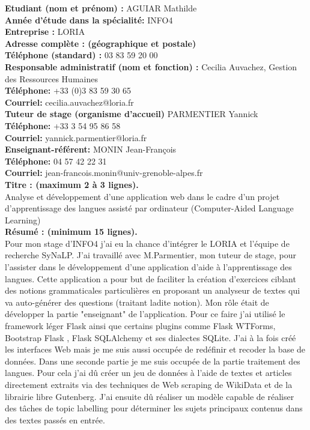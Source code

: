 

\textbf{Etudiant (nom et prénom) :} AGUIAR Mathilde \\
\textbf{Année d’étude dans la spécialité:} INFO4 \\

\textbf{Entreprise :} LORIA \\
\textbf{Adresse complète : (géographique et postale)} \\
\textbf{Téléphone (standard) :} 03 83 59 20 00 \\

\textbf{Responsable administratif (nom et fonction) :} Cecilia Auvachez, Gestion des Ressources Humaines \\
\textbf{Téléphone:} +33 (0)3 83 59 30 65 \\
\textbf{Courriel:} cecilia.auvachez@loria.fr \\

\textbf{Tuteur de stage (organisme d’accueil)} PARMENTIER Yannick\\
\textbf{Téléphone:} +33 3 54 95 86 58 \\
\textbf{Courriel:} yannick.parmentier@loria.fr \\

\textbf{Enseignant-référent:} MONIN Jean-François \\
\textbf{Téléphone:} 04 57 42 22 31 \\
\textbf{Courriel:} jean-francois.monin@univ-grenoble-alpes.fr \\

\textbf{Titre : (maximum 2 à 3 lignes).} \\
Analyse et développement d’une application web dans le cadre d’un projet
d’apprentissage des langues assisté par ordinateur (Computer-Aided Language
Learning) \\
\textbf{Résumé : (minimum 15 lignes).}\\
Pour mon stage d’INFO4 j’ai eu la chance d’intégrer le LORIA et l’équipe de recherche SyNaLP. J’ai travaillé avec M.Parmentier, mon tuteur de stage, pour l’assister dans le développement d’une application d’aide à l’apprentissage des langues. Cette application a pour but de faciliter la création d’exercices ciblant des notions grammaticales particulières en proposant un analyseur de textes qui va auto-générer des questions (traitant ladite notion). 
Mon rôle était de développer la partie "enseignant" de l’application. Pour ce faire j’ai utilisé le framework léger Flask ainsi que certains plugins comme Flask WTForms, Bootstrap Flask , Flask SQLAlchemy et ses dialectes SQLite. J’ai à la fois créé les interfaces Web mais je me suis aussi occupée de redéfinir et recoder la base de données. 
Dans une seconde partie je me suis occupée de la partie traitement des langues. Pour cela j'ai dû créer un jeu de données à l'aide de textes et articles directement extraits via des techniques de Web scraping de WikiData et de la librairie libre Gutenberg. J'ai ensuite dû réaliser un modèle capable de réaliser des tâches de topic labelling pour déterminer les sujets principaux contenus dans des textes passés en entrée. 



